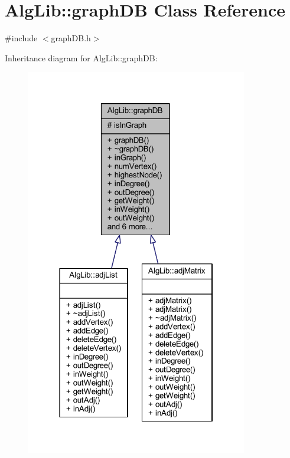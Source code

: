 \hypertarget{class_alg_lib_1_1graph_d_b}{}\section{Alg\+Lib\+:\+:graph\+DB Class Reference}
\label{class_alg_lib_1_1graph_d_b}


{\ttfamily \#include $<$graph\+D\+B.\+h$>$}



Inheritance diagram for Alg\+Lib\+:\+:graph\+DB\+:\nopagebreak
\begin{figure}[H]
\begin{center}
\leavevmode
\includegraphics[width=274pt]{class_alg_lib_1_1graph_d_b__inherit__graph}
\end{center}
\end{figure}


